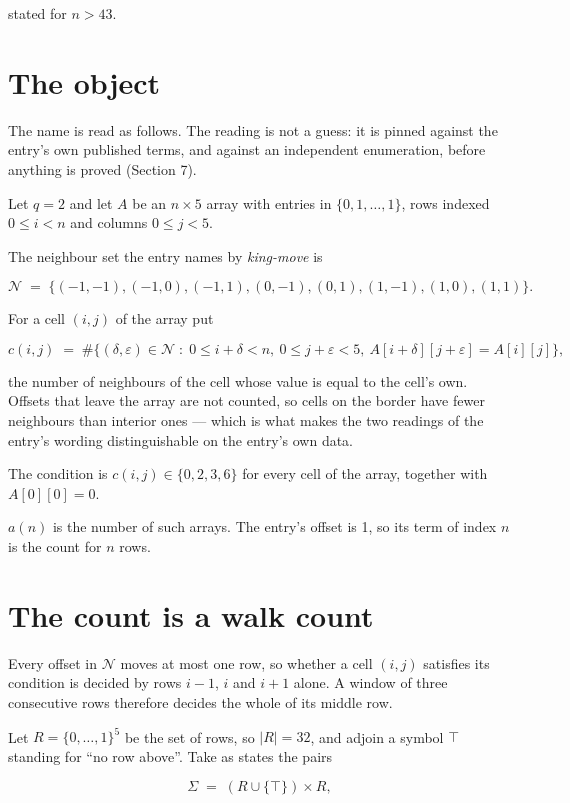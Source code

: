 \documentclass[11pt]{article}
\theoremstyle{definition}
\begin{document}
stated for $n > 43$.

\section{The object}

The name is read as follows. The reading is not a guess: it is pinned against the entry's own published terms, and against an independent enumeration, before anything is proved (Section 7).

Let $q = 2$ and let $A$ be an $n \times 5$ array with entries in $\{0,1,\dots,1\}$, rows indexed $0 \le i < n$ and columns $0 \le j < 5$.

The neighbour set the entry names by {\itshape king-move} is

\[\mathcal{N} \;=\; \{(-1,-1), (-1,0), (-1,1), (0,-1), (0,1), (1,-1), (1,0), (1,1)\}.\]

For a cell $(i,j)$ of the array put

\[c(i,j) \;=\; \#\bigl\{(\delta,\varepsilon)\in\mathcal{N} \;:\; 0\le i+\delta<n,\ 0\le j+\varepsilon<5,\ A[i+\delta][j+\varepsilon] = A[i][j]\bigr\},\]

the number of neighbours of the cell whose value is equal to the cell's own. Offsets that leave the array are not counted, so cells on the border have fewer neighbours than interior ones --- which is what makes the two readings of the entry's wording distinguishable on the entry's own data.

The condition is $c(i,j) \in \{0, 2, 3, 6\}$ for every cell of the array, together with $A[0][0]=0$.

$a(n)$ is the number of such arrays. The entry's offset is 1, so its term of index $n$ is the count for $n$ rows.

\section{The count is a walk count}

Every offset in $\mathcal{N}$ moves at most one row, so whether a cell $(i,j)$ satisfies its condition is decided by rows $i-1$, $i$ and $i+1$ alone. A window of three consecutive rows therefore decides the whole of its middle row.

Let $R = \{0,\dots,1\}^{5}$ be the set of rows, so $|R| = 32$, and adjoin a symbol $\top$ standing for ``no row above''. Take as states the pairs

\[\Sigma \;=\; (R \cup \{\top\}) \times R,\]
\end{document}
